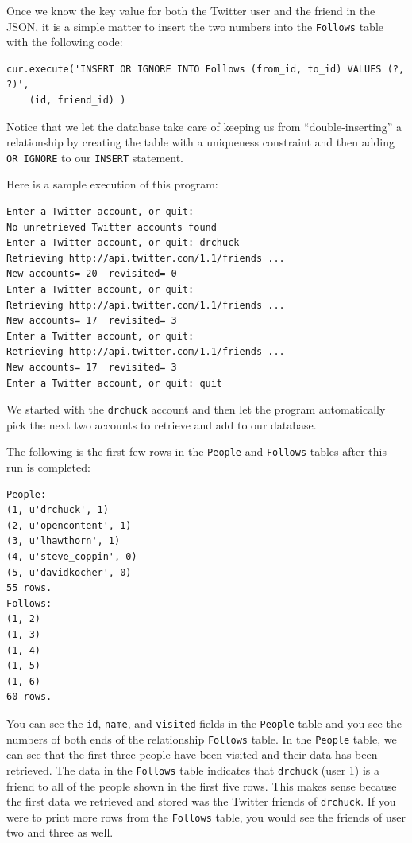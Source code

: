 Once we know the key value for both the Twitter user
and the friend in the JSON, it is a simple matter to insert
the two numbers into the {\tt Follows} table
with the following code:

\beforeverb
\begin{verbatim}
cur.execute('INSERT OR IGNORE INTO Follows (from_id, to_id) VALUES (?, ?)',
    (id, friend_id) )
\end{verbatim}
\afterverb
%
Notice that we let the database take care of keeping us from ``double-inserting''
a relationship by creating the table with a uniqueness constraint and then
adding {\tt OR IGNORE} to our {\tt INSERT} statement.

Here is a sample execution of this program:

\beforeverb
\begin{verbatim}
Enter a Twitter account, or quit: 
No unretrieved Twitter accounts found
Enter a Twitter account, or quit: drchuck
Retrieving http://api.twitter.com/1.1/friends ...
New accounts= 20  revisited= 0
Enter a Twitter account, or quit: 
Retrieving http://api.twitter.com/1.1/friends ...
New accounts= 17  revisited= 3
Enter a Twitter account, or quit: 
Retrieving http://api.twitter.com/1.1/friends ...
New accounts= 17  revisited= 3
Enter a Twitter account, or quit: quit
\end{verbatim}
\afterverb
%
We started with the {\tt drchuck} account and then let the program
automatically pick the next two accounts to retrieve and add to 
our database.

The following is the first few rows in the {\tt People} 
and {\tt Follows} tables after this run is completed:

\beforeverb
\begin{verbatim}
People:
(1, u'drchuck', 1)
(2, u'opencontent', 1)
(3, u'lhawthorn', 1)
(4, u'steve_coppin', 0)
(5, u'davidkocher', 0)
55 rows.
Follows:
(1, 2)
(1, 3)
(1, 4)
(1, 5)
(1, 6)
60 rows.
\end{verbatim}
\afterverb
%
You can see the {\tt id}, {\tt name}, and {\tt visited} fields in the 
{\tt People} table and you see the numbers of both ends of 
the relationship {\tt Follows} table.   
In the {\tt People} table, we can see that the first three people
have been visited and their data has been retrieved.
The data in the {\tt Follows} table indicates that
{\tt drchuck} (user 1) is a friend to all of the people shown in the first
five rows.  This makes sense because
the first data we retrieved and stored was the Twitter friends of
{\tt drchuck}.  If you were to print more rows from the {\tt Follows} table,
you would see the friends of user two and three as well.

